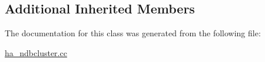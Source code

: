 \subsection*{Additional Inherited Members}


The documentation for this class was generated from the following file\+:\begin{DoxyCompactItemize}
\item 
\mbox{\hyperlink{ha__ndbcluster_8cc}{ha\+\_\+ndbcluster.\+cc}}\end{DoxyCompactItemize}
